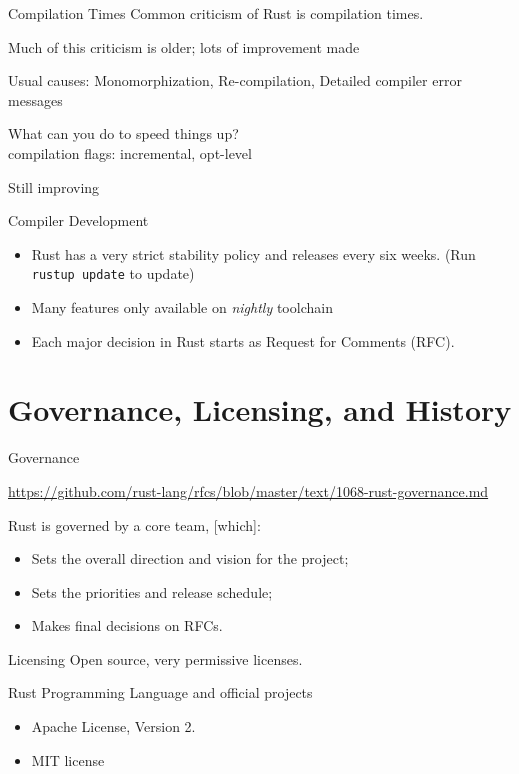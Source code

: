 \documentclass{beamer}
\begin{document}
\begin{frame}{Compilation Times} 
Common criticism of Rust is compilation times. 

Much of this criticism is older; lots of improvement made

Usual causes: Monomorphization, Re-compilation, Detailed compiler error messages

What can you do to speed things up?\\ compilation flags: incremental, opt-level

Still improving

\end{frame}


\begin{frame}{Compiler Development} 
\begin{itemize} [label=$\bullet$] 
\item
Rust has a very strict stability policy and releases every six weeks. (Run
\texttt{rustup update} to update)
\item
Many features only available on \emph{nightly} toolchain
\item 
Each major decision in Rust starts as Request for Comments (RFC).
\end{itemize} 
\end{frame} 


\section{Governance, Licensing, and History} 




\begin{frame}{Governance} 

\url{https://github.com/rust-lang/rfcs/blob/master/text/1068-rust-governance.md}
\begin{block}{}
Rust is governed by a core team, [which]:
\begin{itemize} [label=$\bullet$] 
\item    Sets the overall direction and vision for the project;
\item    Sets the priorities and release schedule;
\item    Makes final decisions on RFCs.
\end{itemize}
\end{block}
\end{frame} 



\begin{frame}{Licensing} 
Open source, very permissive licenses.


\begin{block}{Rust Programming Language and official projects}
\begin{itemize}[label=$\bullet$] 
\item
Apache License, Version 2.
\item
MIT license
\end{itemize}
\end{block}


\end{frame}
\end{document}

